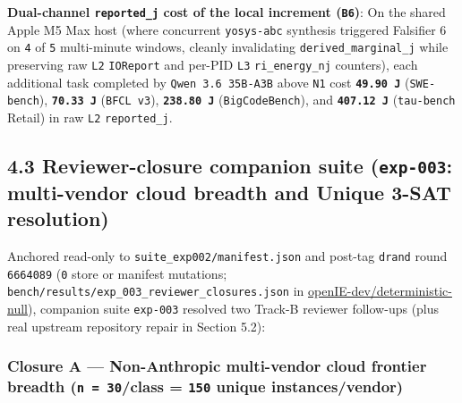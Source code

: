 \documentclass[10pt,letterpaper]{article}
\begin{document}
\begin{enumerate}
  \textbf{Dual-channel \texttt{reported\_\allowbreak{}j} cost of the local increment
  (\texttt{B6})}: On the shared Apple M5 Max host (where concurrent
  \texttt{yosys-abc} synthesis triggered Falsifier 6 on \texttt{4} of
  \texttt{5} multi-minute windows, cleanly invalidating
  \texttt{derived\_\allowbreak{}marginal\_\allowbreak{}j} while preserving raw \texttt{L2}
  \texttt{IOReport} and per-PID \texttt{L3} \texttt{ri\_\allowbreak{}energy\_\allowbreak{}nj}
  counters), each additional task completed by
  \texttt{Qwen\ 3.\allowbreak{}6\ 35B-\allowbreak{}A3B} above \texttt{N1} cost
  \textbf{\texttt{49.90\ J}} (\texttt{SWE-bench}),
  \textbf{\texttt{70.33\ J}} (\texttt{BFCL\ v3}),
  \textbf{\texttt{238.80\ J}} (\texttt{BigCodeBench}), and
  \textbf{\texttt{407.12\ J}} (\texttt{tau-bench} Retail) in raw
  \texttt{L2} \texttt{reported\_\allowbreak{}j}.
\end{enumerate}

\subsection{\texorpdfstring{4.3 Reviewer-closure companion suite
(\texttt{exp-003}: multi-vendor cloud breadth and Unique 3-SAT
resolution)}{4.3 Reviewer-closure companion suite (exp-003: multi-vendor cloud breadth and Unique 3-SAT resolution)}}\label{reviewer-closure-companion-suite-exp-003-multi-vendor-cloud-breadth-and-unique-3-sat-resolution}

Anchored read-only to \texttt{suite\_\allowbreak{}exp002/\allowbreak{}manifest.\allowbreak{}json} and post-tag
\texttt{drand} round \texttt{6664089} (\texttt{0} store or manifest
mutations; \texttt{bench/\allowbreak{}results/\allowbreak{}exp\_\allowbreak{}003\_\allowbreak{}reviewer\_\allowbreak{}closures.\allowbreak{}json} in
\href{https://github.com/openIE-dev/deterministic-null}{openIE-dev/deterministic-null}),
companion suite \texttt{exp-003} resolved two Track-B reviewer
follow-ups (plus real upstream repository repair in Section 5.2):

\subsubsection{\texorpdfstring{Closure A --- Non-Anthropic multi-vendor
cloud frontier breadth (\texttt{n\ =\ 30}/\allowbreak{}class = \texttt{150} unique
instances/vendor)}{Closure A --- Non-Anthropic multi-vendor cloud frontier breadth (n = 30/class = 150 unique instances/vendor)}}\label{closure-a-non-anthropic-multi-vendor-cloud-frontier-breadth-n-30class-150-unique-instancesvendor}
\end{document}
